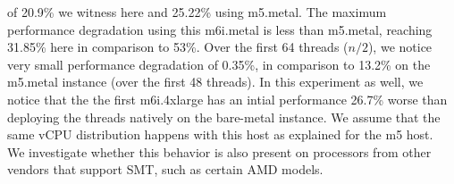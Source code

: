 of 20.9\% we witness here and 25.22\% using m5.metal. The maximum performance degradation using this 
m6i.metal is less than m5.metal, reaching 31.85\% here in comparison to 53\%. Over the first 64 
threads (\begin{math}n/2\end{math}), we notice very small performance degradation of 0.35\%, in 
comparison to 13.2\% on the m5.metal instance (over the first 48 threads). In this experiment as well, 
we notice that the the first m6i.4xlarge has an intial performance 26.7\% worse than deploying the 
threads natively on the bare-metal instance. We assume that the same vCPU distribution happens with this 
host as explained for the m5 host. \\
We investigate whether this behavior is also present on processors from other vendors 
that support \ac{SMT}, such as certain AMD models.
